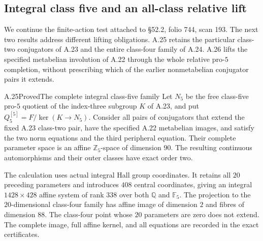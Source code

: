 \subsection{Integral class five and an all-class relative lift}

We continue the finite-action test attached to \S52.2,
folio 744, scan 193. The next two results address different
lifting obligations. A.25 retains the particular class-two
conjugators of A.23 and the entire class-four family of A.24.
A.26 lifts the specified metabelian involution of A.22 through
the whole relative pro-$5$ completion, without prescribing
which of the earlier nonmetabelian conjugator pairs it extends.

\begin{statement}{A.25}{Proved}{The complete integral class-five family}
Let $N_5$ be the free class-five pro-$5$ quotient of the
index-three subgroup $K$ of A.23, and put
$Q_5^{[5]}=F/\ker(K\to N_5)$.
Consider all pairs of conjugators that extend the fixed
A.23 class-two pair, have the specified A.22 metabelian
images, and satisfy the two norm equations and the third
peripheral equation. Their complete parameter space is
an affine $\mathbb Z_5$-space of dimension $90$.
The resulting continuous automorphisms and their outer
classes have exact order two.

The calculation uses actual integral Hall group coordinates.
It retains all $20$ preceding parameters and introduces
$408$ central coordinates, giving an integral
$1428\times428$ affine system of rank $338$ over both
$\mathbb Q$ and $\mathbb F_5$.
The projection to the $20$-dimensional class-four family
has affine image of dimension $2$ and fibres of dimension
$88$. The class-four point whose $20$ parameters are zero
does not extend. The complete image, full affine kernel,
and all equations are recorded in the exact certificates.
\end{statement}
